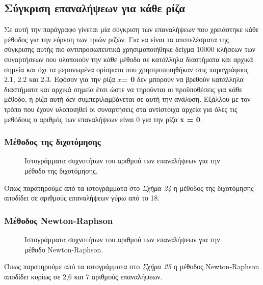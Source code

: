 \documentclass[First Project.tex]{subfiles}
\begin{document}
\subsection{ Σύγκριση επαναλήψεων για κάθε ρίζα }
Σε αυτή την παράγραφο γίνεται μία σύγκριση των επαναλήψεων που χρειάστηκε κάθε μέθοδος για την εύρεση των
τριών ριζών. Για  να είναι τα αποτελέσματα της σύγκρισης αυτής πιο αντιπροσωπευτικά χρησιμοποιήθηκε δείγμα 10000 κλήσεων των συναρτήσεων που υλοποιούν την κάθε μέθοδο
σε κατάλληλα διαστήματα και αρχικά σημεία και όχι τα μεμονωμένα ορίσματα που χρησιμοποιηθήκαν στις παραγράφους 2.1, 2.2 και 2.3. Εφόσον για την ρίζα \textlatin{\textbf{$x$= 0}} δεν μπορούν να βρεθούν κατάλληλα διαστήματα
και αρχικά σημεία έτσι ώστε να τηρούνται οι προϋποθέσεις για κάθε μέθοδο, η ρίζα αυτή δεν συμπεριλαμβάνεται σε αυτή την ανάλυση. Εξάλλου με τον 
τρόπο που έχουν υλοποιηθεί οι συναρτήσεις στα αντίστοιχα αρχεία για όλες τις μεθόδους ο αριθμός των επαναλήψεων είναι 0 για την ρίζα \textlatin{\textbf{x = 0}}.
\newpage
\subsubsection{\textbf{Μέθοδος της διχοτόμησης}}
\vspace{5mm}
\begin{figure}[h!]
    \centering
    \quad
    \caption{ Ιστογράμματα συχνοτήτων του αριθμού των επαναλήψεων για την μέθοδο της διχοτόμησης. }
\end{figure}
Όπως παρατηρούμε από τα ιστογράμματα στο \textit{Σχήμα 24} η μέθοδος της διχοτόμησης αποδίδει σε αριθμούς επαναλήψεων γύρω από το 18.
\subsubsection{\textbf{Μέθοδος \textlatin{Newton-Raphson}}}
\vspace{5mm}
\begin{figure}[h!]
    \centering
    \quad
    \caption{ Ιστογράμματα συχνοτήτων του αριθμού των επαναλήψεων για την μέθοδο \textlatin{Newton-Raphson}. }
\end{figure}
Όπως παρατηρούμε από τα ιστογράμματα στο \textit{Σχήμα 25} η μέθοδος \textlatin{Newton-Raphson} αποδίδει κυρίως σε 2,6 και
7 αριθμούς επαναλήψεων.
\end{document}
